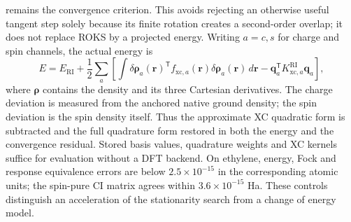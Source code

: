 \documentclass[11pt,a4paper]{article}
\begin{document}
remains the convergence criterion. This avoids rejecting an otherwise
useful tangent step solely because its finite rotation creates a
second-order overlap; it does not replace ROKS by a projected energy.
Writing $a=c,s$ for charge and spin channels, the actual energy is
\begin{equation}
 E=E_{\mathrm{RI}}+\frac12\sum_a
 \left[\int \delta\bm\rho_a(\mathbf r)^{\mathsf T}
 f_{\mathrm{xc},a}(\mathbf r)\delta\bm\rho_a(\mathbf r)\,d\mathbf r
 -\mathbf q_a^{\mathsf T}K_{\mathrm{xc},a}^{\mathrm{RI}}\mathbf q_a\right],
\end{equation}
where $\bm\rho$ contains the density and its three Cartesian derivatives.
The charge deviation is measured from the anchored native ground density;
the spin deviation is the spin density itself. Thus the approximate XC
quadratic form is subtracted and the full quadrature form restored in
both the energy and the convergence residual. Stored basis values,
quadrature weights and XC kernels suffice for evaluation without a DFT
backend. On ethylene, energy, Fock and response equivalence errors are
below $2.5\times10^{-15}$ in the corresponding atomic units; the spin-pure
CI matrix agrees within $3.6\times10^{-15}$ Ha. These controls distinguish
an acceleration of the stationarity search from a change of energy model.
\end{document}
